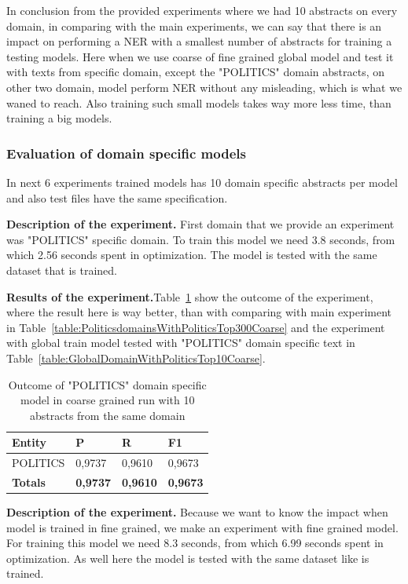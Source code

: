 \documentclass[thesis=M,english]{FITthesis}[2018/05/30]
\begin{document}
	In conclusion from the provided experiments where we had 10 abstracts on every domain, in comparing with the main experiments, we can say that there is an impact on performing a NER with a smallest number of abstracts for training a testing models. Here when we use coarse of fine grained global model and test it with texts from specific domain, except the "POLITICS" domain abstracts, on other two domain, model perform NER without any misleading, which is what we waned to reach. Also training such small models takes way more less time, than training a big models. 
 
 \subsubsection{Evaluation of domain specific models}
	In next 6 experiments trained models has 10 domain specific abstracts per model and also test files have the same specification.
	
	\textbf{Description of the experiment.} First domain that we provide an experiment was "POLITICS" specific domain. To train this model we need 3.8 seconds, from which 2.56 seconds spent in optimization. The model is tested with the same dataset that is trained. 
	
	\textbf{Results of the experiment.}Table~\ref{table:PoliticsDomainWithPoliticsTop10Coarse} show the outcome of the experiment, where the result here is way better, than with comparing with main experiment in Table~\ref{table:PoliticsdomainsWithPoliticsTop300Coarse} and the experiment with global train model tested with "POLITICS" domain specific text in Table~\ref{table:GlobalDomainWithPoliticsTop10Coarse}.  

	\begin{table}[H]\centering
		\begin{tabular}{|l|l|l|l|}
			\hline {\textbf{Entity}} & {\textbf{P}} & {\textbf{R}} & {\textbf{F1}}\\\hline
				POLITICS & 0,9737 & 0,9610 & 0,9673\\\hline
				\textbf{Totals} & \textbf{0,9737} & \textbf{0,9610} & \textbf{0,9673}\\\hline
		\end{tabular}
		\caption{Outcome of "POLITICS" domain specific model in coarse grained run with 10 abstracts from the same domain \label{table:PoliticsDomainWithPoliticsTop10Coarse}}
	\end{table}	
	
	\textbf{Description of the experiment.} Because we want to know the impact when model is trained in fine grained, we make an experiment with fine grained model. For training this model we need 8.3 seconds, from which 6.99 seconds spent in optimization. As well here the model is tested with the same dataset like is trained. 
	
\end{document}
